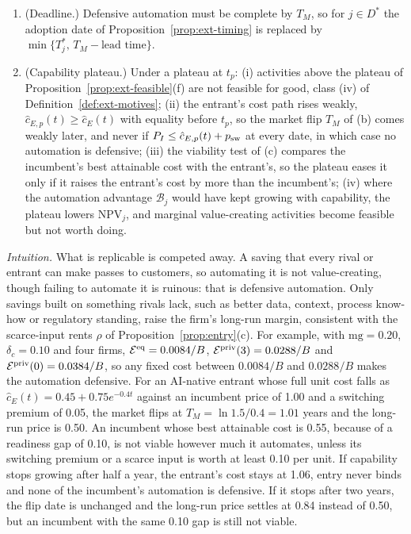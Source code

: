 \begin{proposition}
\begin{enumerate}
\item[(e)] (Deadline.) Defensive automation must be complete by $T_M$, so for $j\in D^*$ the adoption date of Proposition~\ref{prop:ext-timing} is replaced by $\min\{T^*_j,\,T_M-\text{lead time}\}$.
\item[(f)] (Capability plateau.) Under a plateau at $t_p$: (i) activities above the plateau of Proposition~\ref{prop:ext-feasible}(f) are not feasible for good, class (iv) of Definition~\ref{def:ext-motives}; (ii) the entrant's cost path rises weakly, $\hat c_{E,p}(t)\ge\hat c_E(t)$ with equality before $t_p$, so the market flip $T_M$ of (b) comes weakly later, and never if $P_I\le\hat c_{E,p}(t)+p_{\rm sw}$ at every date, in which case no automation is defensive; (iii) the viability test of (c) compares the incumbent's best attainable cost with the entrant's, so the plateau eases it only if it raises the entrant's cost by more than the incumbent's; (iv) where the automation advantage $\mathcal B_j$ would have kept growing with capability, the plateau lowers $\mathrm{NPV}_j$, and marginal value-creating activities become feasible but not worth doing.
\end{enumerate}
\end{proposition}

\noindent\emph{Intuition.} What is replicable is competed away. A saving that every rival or entrant can make passes to customers, so automating it is not value-creating, though failing to automate it is ruinous: that is defensive automation. Only savings built on something rivals lack, such as better data, context, process know-how or regulatory standing, raise the firm's long-run margin, consistent with the scarce-input rents $\rho$ of Proposition~\ref{prop:entry}(c). For example, with $\mathrm{mg}=0.20$, $\delta_c=0.10$ and four firms, $\mathcal E^{\rm eq}=0.0084/B$, $\mathcal E^{\rm priv}(3)=0.0288/B$ and $\mathcal E^{\rm priv}(0)=0.0384/B$, so any fixed cost between $0.0084/B$ and $0.0288/B$ makes the automation defensive. For an AI-native entrant whose full unit cost falls as $\hat c_E(t)=0.45+0.75e^{-0.4t}$ against an incumbent price of 1.00 and a switching premium of 0.05, the market flips at $T_M=\ln1.5/0.4=1.01$ years and the long-run price is 0.50. An incumbent whose best attainable cost is 0.55, because of a readiness gap of 0.10, is not viable however much it automates, unless its switching premium or a scarce input is worth at least 0.10 per unit. If capability stops growing after half a year, the entrant's cost stays at 1.06, entry never binds and none of the incumbent's automation is defensive. If it stops after two years, the flip date is unchanged and the long-run price settles at 0.84 instead of 0.50, but an incumbent with the same 0.10 gap is still not viable.

